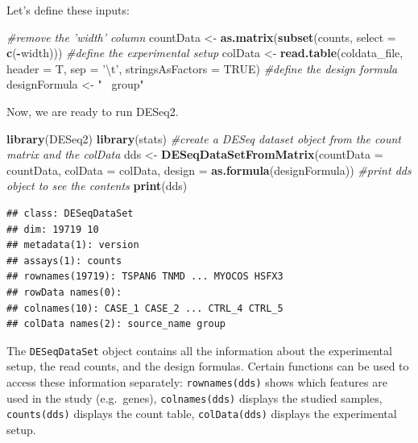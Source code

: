 \documentclass[12pt,]{krantz}
\newenvironment{Shaded}{\begin{snugshade}}{\end{snugshade}}
\newcommand{\CharTok}[1]{\textcolor[rgb]{0.31,0.60,0.02}{#1}}
\newcommand{\CommentTok}[1]{\textcolor[rgb]{0.56,0.35,0.01}{\textit{#1}}}
\newcommand{\DataTypeTok}[1]{\textcolor[rgb]{0.13,0.29,0.53}{#1}}
\newcommand{\KeywordTok}[1]{\textcolor[rgb]{0.13,0.29,0.53}{\textbf{#1}}}
\newcommand{\NormalTok}[1]{#1}
\newcommand{\OperatorTok}[1]{\textcolor[rgb]{0.81,0.36,0.00}{\textbf{#1}}}
\newcommand{\OtherTok}[1]{\textcolor[rgb]{0.56,0.35,0.01}{#1}}
\newcommand{\StringTok}[1]{\textcolor[rgb]{0.31,0.60,0.02}{#1}}
\begin{document}
Let's define these inputs:

\begin{Shaded}
\begin{Highlighting}[]
\CommentTok{#remove the 'width' column}
\NormalTok{countData <-}\StringTok{ }\KeywordTok{as.matrix}\NormalTok{(}\KeywordTok{subset}\NormalTok{(counts, }\DataTypeTok{select =} \KeywordTok{c}\NormalTok{(}\OperatorTok{-}\NormalTok{width)))}
\CommentTok{#define the experimental setup }
\NormalTok{colData <-}\StringTok{ }\KeywordTok{read.table}\NormalTok{(coldata_file, }\DataTypeTok{header =}\NormalTok{ T, }\DataTypeTok{sep =} \StringTok{'}\CharTok{\textbackslash{}t}\StringTok{'}\NormalTok{, }\DataTypeTok{stringsAsFactors =} \OtherTok{TRUE}\NormalTok{)}
\CommentTok{#define the design formula}
\NormalTok{designFormula <-}\StringTok{ "~ group"}
\end{Highlighting}
\end{Shaded}

Now, we are ready to run DESeq2.

\begin{Shaded}
\begin{Highlighting}[]
\KeywordTok{library}\NormalTok{(DESeq2)}
\KeywordTok{library}\NormalTok{(stats)}
\CommentTok{#create a DESeq dataset object from the count matrix and the colData }
\NormalTok{dds <-}\StringTok{ }\KeywordTok{DESeqDataSetFromMatrix}\NormalTok{(}\DataTypeTok{countData =}\NormalTok{ countData, }
                              \DataTypeTok{colData =}\NormalTok{ colData, }
                              \DataTypeTok{design =} \KeywordTok{as.formula}\NormalTok{(designFormula))}
\CommentTok{#print dds object to see the contents}
\KeywordTok{print}\NormalTok{(dds)}
\end{Highlighting}
\end{Shaded}

\begin{verbatim}
## class: DESeqDataSet 
## dim: 19719 10 
## metadata(1): version
## assays(1): counts
## rownames(19719): TSPAN6 TNMD ... MYOCOS HSFX3
## rowData names(0):
## colnames(10): CASE_1 CASE_2 ... CTRL_4 CTRL_5
## colData names(2): source_name group
\end{verbatim}

The \texttt{DESeqDataSet} object contains all the information about the experimental setup, the read counts, and the design formulas. Certain functions can be used to access these information separately: \texttt{rownames(dds)} shows which features are used in the study (e.g.~genes), \texttt{colnames(dds)} displays the studied samples, \texttt{counts(dds)} displays the count table, \texttt{colData(dds)} displays the experimental setup.
\end{document}

